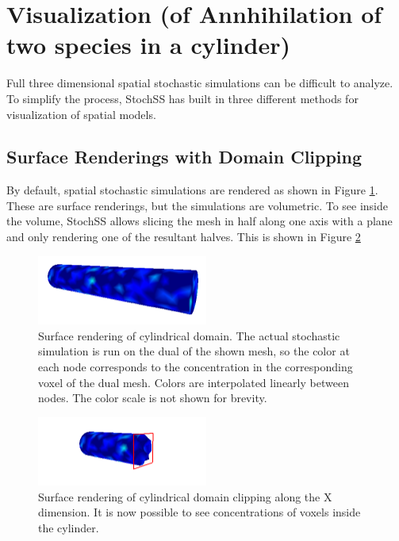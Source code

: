 \section{Visualization (of Annhihilation of two species in a cylinder)}
Full three dimensional spatial stochastic simulations can be difficult to analyze. To simplify the process, StochSS has built in three different methods for visualization of spatial models.

\subsection{Surface Renderings with Domain Clipping}

By default, spatial stochastic simulations are rendered as shown in Figure \ref{surface}. These are surface renderings, but the simulations are volumetric. To see inside the volume, StochSS allows slicing the mesh in half along one axis with a plane and only rendering one of the resultant halves. This is shown in Figure \ref{clipx}

\begin{figure}[!ht]
  \centering
    \includegraphics[width=0.5\textwidth]{surface}
  \caption{ Surface rendering of cylindrical domain. The actual stochastic simulation is run on the dual of the shown mesh, so the color at each node corresponds to the concentration in the corresponding voxel of the dual mesh. Colors are interpolated linearly between nodes. The color scale is not shown for brevity. }
  \label{surface}
\end{figure}

\begin{figure}[!ht]
  \centering
    \includegraphics[width=0.5\textwidth]{clipx}
  \caption{ Surface rendering of cylindrical domain clipping along the X dimension. It is now possible to see concentrations of voxels inside the cylinder. }
  \label{clipx}
\end{figure}

